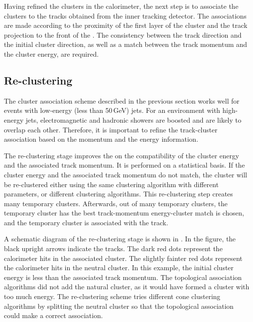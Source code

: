 Having refined the clusters in the calorimeter, the next step is to associate the clusters to the tracks obtained from the inner tracking detector. The associations  are made according to the proximity of the first layer of the cluster and the track projection to the front of the \ECAL. The consistency between the track direction and the initial cluster direction, as well as a match between the track momentum and the cluster energy, are required.


\subsection{Re-clustering}

The cluster association scheme described in the previous section works well for events with low-energy (less than 50\,GeV) jets. For an environment with  high-energy jets, electromagnetic and  hadronic showers are  boosted and are likely to overlap each other. Therefore, it is important to refine the track-cluster association based on the momentum and the energy information. 

The re-clustering stage improves the on the compatibility of the cluster energy and the associated track momentum. It is performed on a statistical basis. If the cluster energy and the associated track momentum do not match, the cluster will be re-clustered either using the same clustering algorithm with different parameters, or different clustering algorithms. This re-clustering step creates many temporary clusters. Afterwards, out of many temporary clusters, the temporary cluster has the best track-momentum energy-cluster match is chosen, and the temporary cluster is  associated with the track.


A schematic diagram of the re-clustering stage is shown in . In the figure, the black upright arrows indicate the tracks. The dark red dots represent the calorimeter hits in the associated cluster. The  slightly fainter red  dots represent the calorimeter hits in the neutral cluster. In this example, the initial cluster energy is less than the associated track momentum. The topological association algorithms did not add the natural cluster, as it would have formed a cluster with too much energy. The re-clustering scheme tries different cone clustering algorithms by splitting the neutral cluster so that the topological association could make a correct association.


